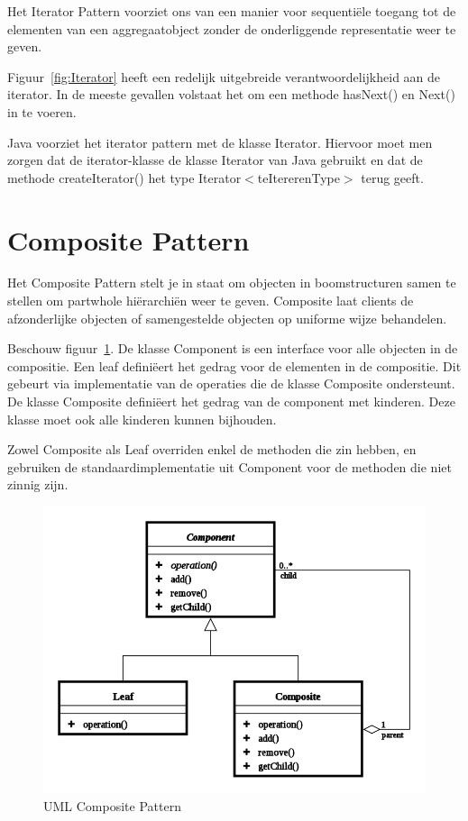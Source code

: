 \documentclass[a4paper,12pt]{article}
\begin{document}
Het Iterator Pattern voorziet ons van een manier voor sequentiële toegang tot de elementen van een aggregaatobject zonder de onderliggende representatie weer te geven.

Figuur~\ref{fig:Iterator} heeft een redelijk uitgebreide verantwoordelijkheid aan de iterator. In de meeste gevallen volstaat het om een methode hasNext() en Next() in te voeren.

Java voorziet het iterator pattern met de klasse Iterator.
Hiervoor moet men zorgen dat de iterator-klasse de klasse Iterator van Java gebruikt en dat de methode createIterator() het type Iterator$<$teItererenType$>$ terug geeft.

\section{Composite Pattern}
Het Composite Pattern stelt je in staat om objecten in boomstructuren samen te stellen om partwhole hiërarchiën weer te geven.
Composite laat clients de afzonderlijke objecten of samengestelde objecten op uniforme wijze behandelen.

Beschouw figuur~\ref{fig:Composite}.
De klasse Component is een interface voor alle objecten in de compositie.
Een leaf definiëert het gedrag voor de elementen in de compositie.
Dit gebeurt via implementatie van de operaties die de klasse Composite ondersteunt.
De klasse Composite definiëert het gedrag van de component met kinderen. Deze klasse moet ook alle kinderen kunnen bijhouden.

Zowel Composite als Leaf overriden enkel de methoden die zin hebben, en gebruiken de standaardimplementatie uit Component voor de methoden die niet zinnig zijn.

\begin{figure}[H]
\centering
  	\includegraphics[width=.7\linewidth]{img/Composite.png}
  	\caption{UML Composite Pattern}
  	\label{fig:Composite}
\end{figure}
\end{document}
